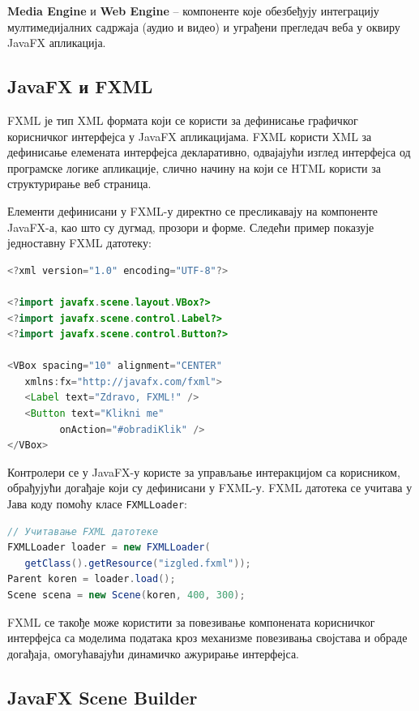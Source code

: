 \textbf{Media Engine} и \textbf{Web Engine} – компоненте које обезбеђују интеграцију мултимедијалних садржаја (аудио и видео) и уграђени прегледач веба у оквиру JavaFX апликација.


\subsection{JavaFX и FXML}

FXML је тип XML формата који се користи за дефинисање графичког корисничког интерфејса у JavaFX апликацијама. FXML користи XML за дефинисање елемената интерфејса декларативно, одвајајући изглед интерфејса од програмске логике апликације, слично начину на који се HTML користи за структурирање веб страница.

Елементи дефинисани у FXML-у директно се пресликавају на компоненте JavaFX-а, као што су дугмад, прозори и форме. Следећи пример показује једноставну FXML датотеку:


\begin{lstlisting}[language=Java]
<?xml version="1.0" encoding="UTF-8"?>
 
<?import javafx.scene.layout.VBox?>
<?import javafx.scene.control.Label?>
<?import javafx.scene.control.Button?>
 
<VBox spacing="10" alignment="CENTER"
   xmlns:fx="http://javafx.com/fxml">
   <Label text="Zdravo, FXML!" />
   <Button text="Klikni me"
         onAction="#obradiKlik" />
</VBox>
\end{lstlisting}


Контролери се у JavaFX-у користе за управљање интеракцијом са корисником, обрађујући догађаје који су дефинисани у FXML-у. FXML датотека се учитава у Јава коду помоћу класе \texttt{FXMLLoader}:


\begin{lstlisting}[language=Java]
// Учитавање FXML датотеке
FXMLLoader loader = new FXMLLoader(
   getClass().getResource("izgled.fxml"));
Parent koren = loader.load();
Scene scena = new Scene(koren, 400, 300);
\end{lstlisting}


FXML се такође може користити за повезивање компонената корисничког интерфејса са моделима података кроз механизме повезивања својстава и обраде догађаја, омогућавајући динамичко ажурирање интерфејса.


\subsection{JavaFX Scene Builder}

